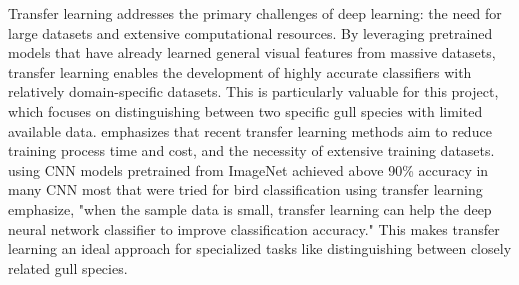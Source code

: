 \documentclass[a4paper,12pt]{report}
\begin{document}

Transfer learning addresses the primary challenges of deep learning: the need for large datasets and extensive computational resources. By leveraging pretrained models that have already learned general visual features from massive datasets, transfer learning enables the development of highly accurate classifiers with relatively domain-specific datasets. This is particularly valuable for this project, which focuses on distinguishing between two specific gull species with limited available data. \citep{iman2022review} emphasizes that recent transfer learning methods aim to reduce training process time and cost, and the necessity of extensive training datasets. \citep{transferln97} using CNN models pretrained from ImageNet achieved above 90\% accuracy in many CNN most that were tried for bird classification using transfer learning emphasize, "when the sample data is small, transfer learning can help the deep neural network classifier to improve classification accuracy." This makes transfer learning an ideal approach for specialized tasks like distinguishing between closely related gull species.






\end{document}
